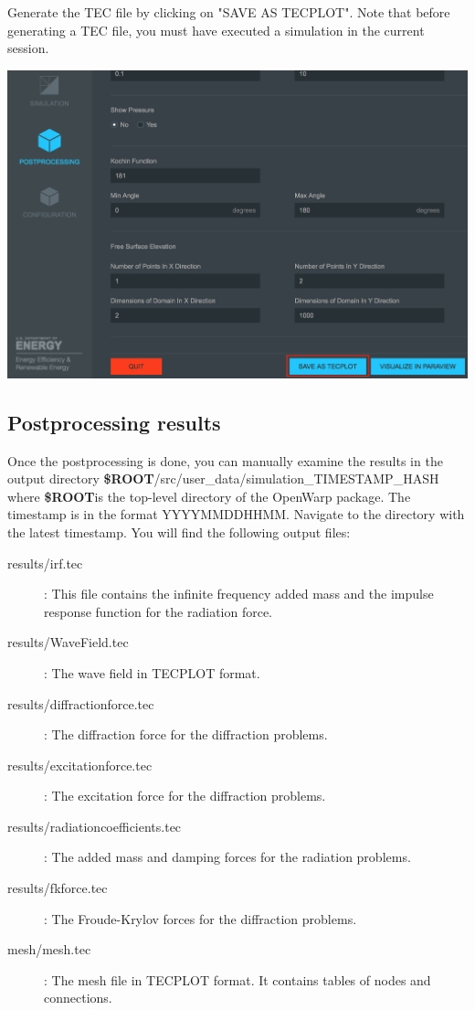 \documentclass[12pt]{article}
\newcommand{\ROOT}{{\textbf{\$ROOT}}}
\begin{document}
Generate the TEC file by clicking on "SAVE AS TECPLOT". Note that before generating a TEC file, you must have executed a simulation in the current session.

\vspace{\abovedisplayskip}
\begin{minipage}{\linewidth}
	\centering
	\includegraphics[scale=0.4]{img/36}
\end{minipage}
\vspace{\belowdisplayskip}

\subsection{Postprocessing results}
Once the postprocessing is done, you can manually examine the results in the output directory \ROOT/src/user_data/simulation_TIMESTAMP_HASH where \ROOT is the top-level directory of the OpenWarp package.
The timestamp is in the format YYYYMMDDHHMM. Navigate to the directory with the latest timestamp. You will find the following output files:


\begin{description}
	\item [results/irf.tec]: This file contains the infinite frequency added mass and the impulse response function for the radiation force.
	\item [results/WaveField.tec]: The wave field in TECPLOT format.
	\item [results/diffractionforce.tec]: The diffraction force for the diffraction problems.
	\item [results/excitationforce.tec]: The excitation force for the diffraction problems.
	\item [results/radiationcoefficients.tec]: The added mass and damping forces for the radiation problems.
	\item [results/fkforce.tec]: The Froude-Krylov forces for the diffraction problems.
	\item [mesh/mesh.tec]: The mesh file in TECPLOT format. It contains tables of nodes and connections.
\end{description}
\end{document}
